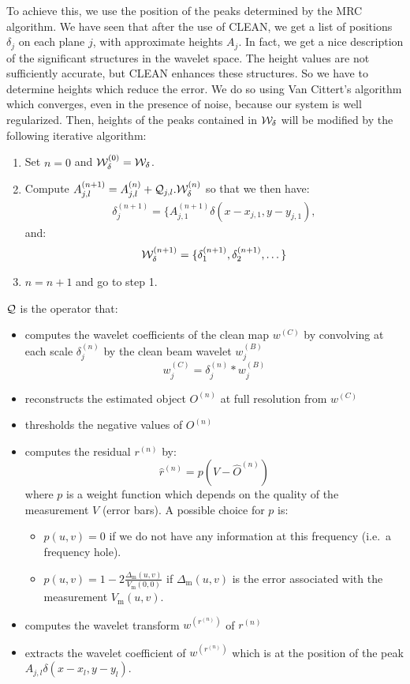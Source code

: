 To achieve this, we use the position of the
peaks determined by the MRC algorithm. We have seen that after
the use of CLEAN, we get a list of positions $\delta_j$ on each plane $j$, with
 approximate heights $A_j$. In fact, we get a nice description
 of the significant structures in the wavelet space. 
The height values are not sufficiently accurate, 
but CLEAN enhances these structures.
So we have to determine heights which reduce the error. 
We do so using Van Cittert's algorithm \cite{rest:vancittert31}
which converges, even in the presence of noise,
because our system is well regularized. Then, heights of the peaks
contained in ${\cal W}_{\delta}$ will be modified by the following
iterative algorithm:

\begin{enumerate}
\item Set $n = 0$ and ${\cal W}_{\delta}^{(0)} = {\cal W}_{\delta}$.
\item Compute $A_{j,l}^{(n+1)}  = A_{j,l}^{(n)} + 
{\cal Q}_{j,l}.{\cal W}_{\delta}^{(n)}$
so that we then have:
\begin{eqnarray*}
\delta_j^{(n+1)} = \{ A_{j,1}^{(n+1)} \delta(x-x_{j,1}, y-y_{j,1}),  
\end{eqnarray*}
and:
\begin{eqnarray*}
{\cal W}_{\delta}^{(n+1)} =  \{\delta_1^{(n+1)}, \delta_2^{(n+1)}, \dots\}
\end{eqnarray*}
\item $n = n + 1$ and go to step 1.
\end{enumerate}

${\cal Q}$ is the  operator that:
\begin{itemize}
\item computes the  wavelet coefficients of the clean map $w^{(C)}$ by
convolving at each scale $\delta_j^{(n)}$ by the clean beam wavelet $w_j^{(B)}$
\[w_j^{(C)} = \delta_j^{(n)} * w_j^{(B)}\] 
\item reconstructs  the estimated object $O^{(n)}$ at  full resolution
from $w^{(C)}$
\item thresholds  the negative values of $O^{(n)}$
\item computes  the residual $r^{(n)}$ by:
\[\hat{r}^{(n)} = p(V - \hat{O}^{(n)})\]
 where $p$ is a weight function which depends on the quality of the
measurement $V$ (error bars). A possible choice for $p$ is:
\begin{itemize}
\item $p(u,v) = 0$ if we do not have any information at this frequency (i.e.\ 
a frequency hole).
\item $p(u,v) = 1 - 2 \frac{\Delta_{\mbox{m}}(u,v)}{V_{\mbox{m}}(0,0)}$ 
if $\Delta_{\mbox{m}}(u,v)$
is the error associated with the measurement $V_{\mbox{m}}(u,v)$.
\end{itemize}
\item computes the wavelet transform $w^{(r^{(n)})}$ of $r^{(n)}$ 
\item extracts the wavelet coefficient of $w^{(r^{(n)})}$ which is at 
the position of the peak $A_{j,l} \delta(x - x_l, y - y_l)$.
\end{itemize}

